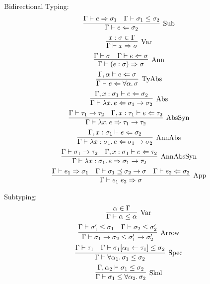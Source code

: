 Bidirectional Typing:
\begin{gather*}
  \infer[\text{Sub}]{
    \Gamma \vdash e \Leftarrow \sigma_2
  }{
    \Gamma \vdash e \Rightarrow \sigma_1
    &
    \Gamma \vdash \sigma_1 \leq \sigma_2
  }
  \\
  \infer[\text{Var}]{
    \Gamma \vdash x \Rightarrow \sigma
  }{
    x: \sigma \in \Gamma
  }
  \\
  \infer[\text{Ann}]{
    \Gamma \vdash (e: \sigma) \Rightarrow \sigma
  }{
    \Gamma \vdash \sigma
    &
    \Gamma \vdash e \Leftarrow \sigma
  }
  \\
  \infer[\text{TyAbs}]{
    \Gamma \vdash e \Leftarrow \forall \alpha\ldotp \sigma
  }{
    \Gamma, \alpha \vdash e \Leftarrow \sigma
  }
  \\
  \infer[\text{Abs}]{
    \Gamma \vdash \lambda x\ldotp e \Leftarrow \sigma_1 \to \sigma_2
  }{
    \Gamma, x: \sigma_1 \vdash e \Leftarrow \sigma_2
  }
  \\
  \infer[\text{AbsSyn}]{
    \Gamma \vdash \lambda x\ldotp e \Rightarrow \tau_1 \to \tau_2
  }{
    \Gamma \vdash \tau_1 \to \tau_2
    &
    \Gamma, x: \tau_1 \vdash e \Leftarrow \tau_2
  }
  \\
  \infer[\text{AnnAbs}]{
    \Gamma \vdash \lambda x: \sigma_1\ldotp e \Leftarrow \sigma_1 \to \sigma_2
  }{
    \Gamma, x: \sigma_1 \vdash e \Leftarrow \sigma_2
  }
  \\
  \infer[\text{AnnAbsSyn}]{
    \Gamma \vdash \lambda x: \sigma_1\ldotp e \Rightarrow \sigma_1 \to \tau_2
  }{
    \Gamma \vdash \sigma_1 \to \tau_2
    &
    \Gamma, x: \sigma_1 \vdash e \Leftarrow \tau_2
  }
  \\
  \infer[\text{App}]{
    \Gamma \vdash e_1\; e_2 \Rightarrow \sigma
  }{
    \Gamma \vdash e_1 \Rightarrow \sigma_1
    &
    \Gamma \vdash \sigma_1 \preceq \sigma_2 \to \sigma
    &
    \Gamma \vdash e_2 \Leftarrow \sigma_2
  }
\end{gather*}

Subtyping:
\begin{gather*}
  \infer[\text{Var}]{
    \Gamma \vdash \alpha \leq \alpha
  }{
    \alpha \in \Gamma
  }
  \\
  \infer[\text{Arrow}]{
    \Gamma \vdash \sigma_1 \to \sigma_2 \leq \sigma'_1 \to \sigma'_2
  }{
    \Gamma \vdash \sigma'_1 \leq \sigma_1
    &
    \Gamma \vdash \sigma_2 \leq \sigma'_2
  }
  \\
  \infer[\text{Spec}]{
    \Gamma \vdash \forall \alpha_1\ldotp \sigma_1 \leq \sigma_2
  }{
    \Gamma \vdash \tau_1
    &
    \Gamma \vdash \sigma_1[\alpha_1 \assign \tau_1] \leq \sigma_2
  }
  \\
  \infer[\text{Skol}]{
    \Gamma \vdash \sigma_1 \leq \forall \alpha_2\ldotp \sigma_2
  }{
    \Gamma, \alpha_2 \vdash \sigma_1 \leq \sigma_2
  }
\end{gather*}

